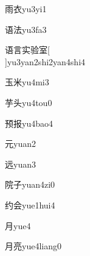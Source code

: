 \begin{verbete}[8;6]{雨衣}{yu3yi1}
\end{verbete}

\begin{verbete}[9;8]{语法}{yu3fa3}
\end{verbete}

\begin{verbete}[9;7;8;10;9]{语言实验室}[\\]{yu3yan2shi2yan4shi4}
\end{verbete}

\begin{verbete}[5;6]{玉米}{yu4mi3}
\end{verbete}                                                                                                                       

\begin{verbete}[6;5]{芋头}{yu4tou0}
\end{verbete}

\begin{verbete}[10;7]{预报}{yu4bao4}
\end{verbete}

\begin{verbete}[4]{元}{yuan2}
\end{verbete}

\begin{verbete}[7]{远}{yuan3}
\end{verbete}

\begin{verbete}[9;3]{院子}{yuan4zi0}
\end{verbete}

\begin{verbete}[6;6]{约会}{yue1hui4}
\end{verbete}

\begin{verbete}[4]{月}{yue4}
\end{verbete}

\begin{verbete}[4;9]{月亮}{yue4liang0}
\end{verbete}

